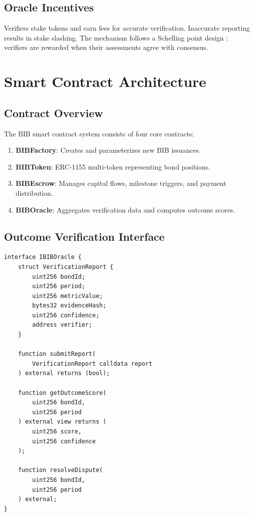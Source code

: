 \documentclass[11pt,a4paper]{article}
\begin{document}
\subsection{Oracle Incentives}

Verifiers stake tokens and earn fees for accurate verification.
Inaccurate reporting results in stake slashing. The mechanism follows a
Schelling point design \citep{buterin2014schellingcoin}: verifiers are
rewarded when their assessments agree with consensus.


\section{Smart Contract Architecture}
\label{sec:contracts}

\subsection{Contract Overview}

The BIB smart contract system consists of four core contracts:

\begin{enumerate}
  \item \textbf{BIBFactory}: Creates and parameterizes new BIB issuances.
  \item \textbf{BIBToken}: ERC-1155 multi-token representing bond
    positions.
  \item \textbf{BIBEscrow}: Manages capital flows, milestone triggers,
    and payment distribution.
  \item \textbf{BIBOracle}: Aggregates verification data and computes
    outcome scores.
\end{enumerate}

\subsection{Outcome Verification Interface}

\begin{lstlisting}[caption={Oracle verification interface.},
  label={lst:oracle}]
interface IBIBOracle {
    struct VerificationReport {
        uint256 bondId;
        uint256 period;
        uint256 metricValue;
        bytes32 evidenceHash;
        uint256 confidence;
        address verifier;
    }

    function submitReport(
        VerificationReport calldata report
    ) external returns (bool);

    function getOutcomeScore(
        uint256 bondId,
        uint256 period
    ) external view returns (
        uint256 score,
        uint256 confidence
    );

    function resolveDispute(
        uint256 bondId,
        uint256 period
    ) external;
}
\end{lstlisting}
\end{document}
